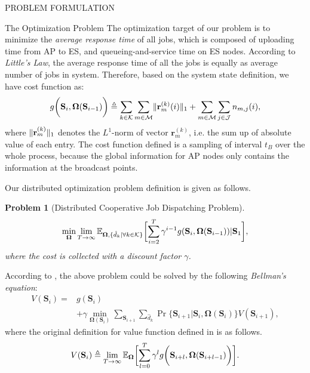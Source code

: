 \documentclass[10pt, conference, letterpaper]{IEEEtran}
\newtheorem{problem}{Problem}
\newcommand{\define}{\triangleq}
\renewcommand{\vec}{\mathbf}
\DeclarePairedDelimiter{\set}{\{}{\}}
\DeclarePairedDelimiter{\Inorm}{\|}{\|_1}
\DeclarePairedDelimiter{\Paren}{\bigg(}{\bigg)}
\DeclarePairedDelimiter{\Bracket}{\bigg[}{\bigg]}
\newcommand{\apSet}{\mathcal{K}}
\newcommand{\esSet}{\mathcal{M}}
\newcommand{\jSpace}{\mathcal{J}}
\newcommand{\Stat}{\mathbf{S}}
\newcommand{\Policy}{\mathbf{\Omega}}
\begin{document}
\begin{section}{PROBLEM FORMULATION}
        \begin{subsection}{The Optimization Problem}
            The optimization target of our problem is to minimize the \emph{average response time} of all jobs, which is composed of uploading time from AP to ES, and queueing-and-service time on ES nodes. According to \emph{Little's Law}, the average response time of all the jobs is equally as average number of jobs in system. Therefore, based on the system state definition, we have cost function as:
            \begin{align}
                g\Paren{\Stat_{i}, \Policy(\Stat_{i-1})} \define
                        \sum_{k\in\apSet}\sum_{m\in\esSet} \Inorm{\vec{r}^{(k)}_{m}(i)} +
                        \sum_{m\in\esSet}\sum_{j\in\jSpace} n_{m,j}(i),
            \end{align}
            where $\Inorm{\vec{r}^{(k)}_{m}}$ denotes the $L^1$-norm of vector $\vec{r}^{(k)}_{m}$, i.e. the sum up of absolute value of each entry. The cost function defined is a sampling of interval $t_B$ over the whole process, because the global information for AP nodes only contains the information at the broadcast points.

            Our distributed optimization problem definition is given as follows.
            \begin{problem}[Distributed Cooperative Job Dispatching Problem]
                \begin{gather}
                    \min_{\Policy} \lim_{T \to \infty}
                        \mathbb{E}_{\Policy, \set{\hat{d}_k|\forall k\in\apSet}}
                            \Bracket{\sum_{i=2}^{T} \gamma^{i-1} g(\Stat_{i}, \Policy(\Stat_{i-1}))|\Stat_1},
                \end{gather}
                where the cost is collected with a discount factor $\gamma$.
            \end{problem}

            According to \cite{sutton1998introduction}, the above problem could be solved by the following \emph{Bellman's equation}:
            \begin{align}
                V(\Stat_{i}) =& g(\Stat_i)
                \nonumber\\
                &+ \gamma \min_{\Policy(\Stat_{i})} \sum_{\Stat_{i+1}} \sum_{\hat{d}_k} \Pr\{ \Stat_{i+1}|\Stat_{i}, \Policy(\Stat_{i}) \} V(\Stat_{i+1}),
            \end{align}
            where the original definition for value function defined in \cite{sutton1998introduction} is as follows.
            \begin{align}
                V(\Stat_{i}) \define \lim_{T\to\infty}
                    \mathbb{E}_{\Policy}\Bracket{
                        \sum_{l=0}^{T} \gamma^l g\Paren{\Stat_{i+l}, \Policy(\Stat_{i+l-1})}
                    }.
            \end{align}


\end{subsection}
\end{section}
\end{document}
